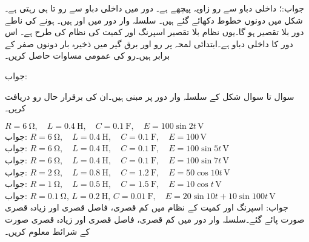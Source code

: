 جواب:؛ داخلی دباو سے رو  زاویہ پیچھے ہے۔ دور میں داخلی دباو سے رو  تا   ہی رہتی ہے۔شکل  میں دونوں خطوط دکھائے گئے ہیں۔
سلسلہ وار  دور میں  اور  ہیں۔ ہونے کی ناطے  دور بلا تقصیر ہو گا۔یوں  نظام بلا تقصیر اسپرنگ اور کمیت  کی نظام کی طرح ہے۔ اس دور کا داخلی دباو  ہے۔ابتدائی لمحہ  پر رو اور برق گیر میں ذخیرہ بار دونوں صفر کے برابر ہیں۔رو کی عمومی مساوات حاصل کریں۔

جواب: 

سوال  تا سوال   شکل  کے سلسلہ وار  دور پر مبنی ہیں۔ان کی برقرار حال رو دریافت کریں۔

\quad
$R=\SI{6}{\ohm}, \quad L=\SI{0.4}{\henry}, \quad C=\SI{0.1}{\farad}, \quad E=100\sin 2t\,\si{\volt}$\\
جواب:
\quad
$R=\SI{6}{\ohm}, \quad L=\SI{0.4}{\henry}, \quad C=\SI{0.1}{\farad}, \quad E=100\,\si{\volt}$\\
جواب:
\quad
$R=\SI{6}{\ohm}, \quad L=\SI{0.4}{\henry}, \quad C=\SI{0.1}{\farad}, \quad E=100\sin 5t\,\si{\volt}$\\
جواب:
\quad
$R=\SI{6}{\ohm}, \quad L=\SI{0.4}{\henry}, \quad C=\SI{0.1}{\farad}, \quad E=100\sin 7t\,\si{\volt}$\\
جواب:
\quad
$R=\SI{2}{\ohm}, \quad L=\SI{0.8}{\henry}, \quad C=\SI{1.2}{\farad}, \quad E=50\cos 10t\,\si{\volt}$\\
جواب:
\quad
$R=\SI{1}{\ohm}, \quad L=\SI{0.5}{\henry}, \quad C=\SI{1.5}{\farad}, \quad E=10\cos t\,\si{\volt}$\\
جواب:
\quad
$R=\SI{0.1}{\ohm}, \, L=\SI{0.2}{\henry}, \, C=\SI{0.01}{\farad}, \quad E=20\sin 10t+10\sin 100t\,\si{\volt}$\\
جواب:
اسپرنگ اور  کمیت کے نظام میں کم قصری، فاصل قصری اور زیادہ قصری صورت پائے گئے۔سلسلہ وار  دور میں کم قصری، فاصل قصری اور زیادہ قصری صورت کے شرائط معلوم کریں۔

